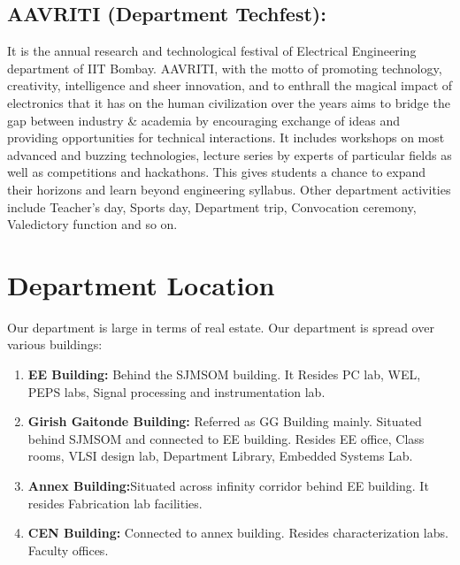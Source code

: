 \documentclass[11pt,fleqn,openany]{book} %
\begin{document}
\section {AAVRITI (Department Techfest):}
It is the annual research and technological festival of Electrical Engineering department of IIT Bombay. AAVRITI, with the motto of promoting technology, creativity, intelligence and sheer innovation, and to enthrall the magical impact of electronics that it has on the human civilization over the years aims to bridge the gap between industry \& academia by encouraging exchange of ideas and providing opportunities for technical interactions.\newline
It includes workshops on most advanced and buzzing technologies, lecture series by experts of particular fields as well as competitions and hackathons. This gives students a chance to expand their horizons and learn beyond engineering syllabus.\newline
Other department activities include Teacher’s day, Sports day, Department trip, Convocation ceremony, Valedictory function and so on.
\chapter{Department Location }
Our department is large in terms of real estate. Our department is spread over various buildings: \newline
\begin{enumerate}
    \item  \textbf{EE Building:} \newline  Behind the SJMSOM building. It Resides PC lab, WEL, PEPS labs, Signal processing and instrumentation lab.
    \item  \textbf{Girish Gaitonde Building:} \newline Referred as GG Building mainly. Situated behind SJMSOM and connected to EE building. Resides EE office, Class rooms, VLSI design lab, Department Library, Embedded Systems Lab.
    \item \textbf{Annex Building:}\newline  Situated across infinity corridor behind EE building. It resides Fabrication lab facilities.
    \item \textbf{CEN Building:} \newline Connected to annex building. Resides characterization labs. Faculty offices.
\end{enumerate}
\end{document}
